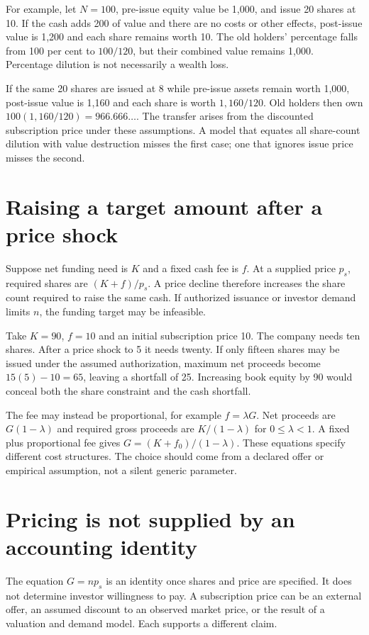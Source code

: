 For example, let $N=100$, pre-issue equity value be 1,000, and issue 20 shares at 10. If the cash adds 200 of value and there are no costs or other effects, post-issue value is 1,200 and each share remains worth 10. The old holders' percentage falls from 100 per cent to $100/120$, but their combined value remains 1,000. Percentage dilution is not necessarily a wealth loss.

If the same 20 shares are issued at 8 while pre-issue assets remain worth 1,000, post-issue value is 1,160 and each share is worth $1,160/120$. Old holders then own $100(1,160/120)=966.666\ldots$. The transfer arises from the discounted subscription price under these assumptions. A model that equates all share-count dilution with value destruction misses the first case; one that ignores issue price misses the second.

\section{Raising a target amount after a price shock}
Suppose net funding need is $K$ and a fixed cash fee is $f$. At a supplied price $p_s$, required shares are $(K+f)/p_s$. A price decline therefore increases the share count required to raise the same cash. If authorized issuance or investor demand limits $n$, the funding target may be infeasible.

Take $K=90$, $f=10$ and an initial subscription price 10. The company needs ten shares. After a price shock to 5 it needs twenty. If only fifteen shares may be issued under the assumed authorization, maximum net proceeds become $15(5)-10=65$, leaving a shortfall of 25. Increasing book equity by 90 would conceal both the share constraint and the cash shortfall.

The fee may instead be proportional, for example $f=\lambda G$. Net proceeds are $G(1-\lambda)$ and required gross proceeds are $K/(1-\lambda)$ for $0\leq\lambda<1$. A fixed plus proportional fee gives $G=(K+f_0)/(1-\lambda)$. These equations specify different cost structures. The choice should come from a declared offer or empirical assumption, not a silent generic parameter.

\section{Pricing is not supplied by an accounting identity}
The equation $G=np_s$ is an identity once shares and price are specified. It does not determine investor willingness to pay. A subscription price can be an external offer, an assumed discount to an observed market price, or the result of a valuation and demand model. Each supports a different claim.

